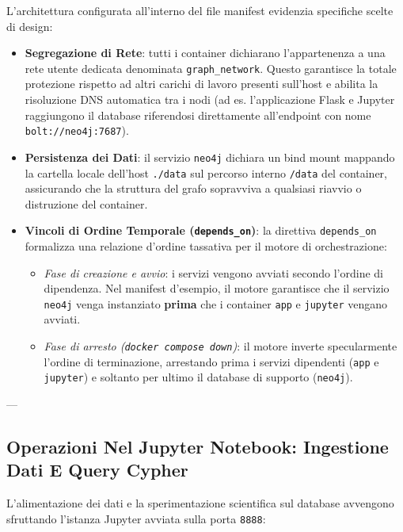 \documentclass[11pt, a4paper]{article}
\begin{document}
L'architettura configurata all'interno del file manifest evidenzia specifiche scelte di design:
\begin{itemize}
    \item \textbf{Segregazione di Rete}: tutti i container dichiarano l'appartenenza a una rete utente dedicata denominata \texttt{graph\_network}. Questo garantisce la totale protezione rispetto ad altri carichi di lavoro presenti sull'host e abilita la risoluzione DNS automatica tra i nodi (ad es. l'applicazione Flask e Jupyter raggiungono il database riferendosi direttamente all'endpoint con nome \texttt{bolt://neo4j:7687}).
    \item \textbf{Persistenza dei Dati}: il servizio \texttt{neo4j} dichiara un bind mount mappando la cartella locale dell'host \texttt{./data} sul percorso interno \texttt{/data} del container, assicurando che la struttura del grafo sopravviva a qualsiasi riavvio o distruzione del container.
    \item \textbf{Vincoli di Ordine Temporale (\texttt{depends\_on})}: la direttiva \texttt{depends\_on} formalizza una relazione d'ordine tassativa per il motore di orchestrazione:
    \begin{itemize}
        \item \emph{Fase di creazione e avvio}: i servizi vengono avviati secondo l'ordine di dipendenza. Nel manifest d'esempio, il motore garantisce che il servizio \texttt{neo4j} venga instanziato \textbf{prima} che i container \texttt{app} e \texttt{jupyter} vengano avviati.
        \item \emph{Fase di arresto (\texttt{docker compose down})}: il motore inverte specularmente l'ordine di terminazione, arrestando prima i servizi dipendenti (\texttt{app} e \texttt{jupyter}) e soltanto per ultimo il database di supporto (\texttt{neo4j}).
    \end{itemize}
\end{itemize}

---

\subsection{Operazioni Nel Jupyter Notebook: Ingestione Dati E Query Cypher}

L'alimentazione dei dati e la sperimentazione scientifica sul database avvengono sfruttando l'istanza Jupyter avviata sulla porta \texttt{8888}:
\end{document}
